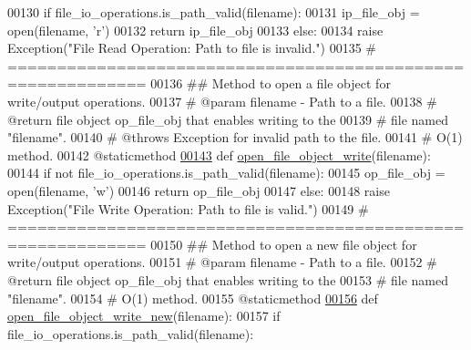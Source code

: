 \begin{DoxyCode}
00130         \textcolor{keywordflow}{if} file\_io\_operations.is\_path\_valid(filename):
00131             ip\_file\_obj = open(filename, \textcolor{stringliteral}{'}\textcolor{stringliteral}{r')}
00132 \textcolor{stringliteral}{            }\textcolor{keywordflow}{return} ip\_file\_obj
00133         \textcolor{keywordflow}{else}:
00134             \textcolor{keywordflow}{raise} Exception(\textcolor{stringliteral}{"File Read Operation: Path to file is invalid."})
00135     \textcolor{comment}{# ============================================================}
00136     \textcolor{comment}{##  Method to open a file object for write/output operations.}
00137     \textcolor{comment}{#   @param filename - Path to a file.}
00138     \textcolor{comment}{#   @return file object op\_file\_obj that enables writing to the}
00139     \textcolor{comment}{#       file named "filename".}
00140     \textcolor{comment}{#   @throws Exception for invalid path to the file.}
00141     \textcolor{comment}{#   O(1) method.}
00142     @staticmethod
\hypertarget{file__io_8py_source_l00143}{}\hyperlink{classutilities_1_1file__io_1_1file__io__operations_aaf94e26da1d988ece479d1600ad1de4a}{00143}     \textcolor{keyword}{def }\hyperlink{classutilities_1_1file__io_1_1file__io__operations_aaf94e26da1d988ece479d1600ad1de4a}{open\_file\_object\_write}(filename):
00144         \textcolor{keywordflow}{if} \textcolor{keywordflow}{not} file\_io\_operations.is\_path\_valid(filename):
00145             op\_file\_obj = open(filename, \textcolor{stringliteral}{'w'})
00146             \textcolor{keywordflow}{return} op\_file\_obj
00147         \textcolor{keywordflow}{else}:
00148             \textcolor{keywordflow}{raise} Exception(\textcolor{stringliteral}{"File Write Operation: Path to file is valid."})
00149     \textcolor{comment}{# ============================================================}
00150     \textcolor{comment}{##  Method to open a new file object for write/output operations.}
00151     \textcolor{comment}{#   @param filename - Path to a file.}
00152     \textcolor{comment}{#   @return file object op\_file\_obj that enables writing to the}
00153     \textcolor{comment}{#       file named "filename".}
00154     \textcolor{comment}{#   O(1) method.}
00155     @staticmethod
\hypertarget{file__io_8py_source_l00156}{}\hyperlink{classutilities_1_1file__io_1_1file__io__operations_aefa9041777265e5066f9f5a48fb5a21e}{00156}     \textcolor{keyword}{def }\hyperlink{classutilities_1_1file__io_1_1file__io__operations_aefa9041777265e5066f9f5a48fb5a21e}{open\_file\_object\_write\_new}(filename):
00157         \textcolor{keywordflow}{if} file\_io\_operations.is\_path\_valid(filename):

\end{DoxyCode}
